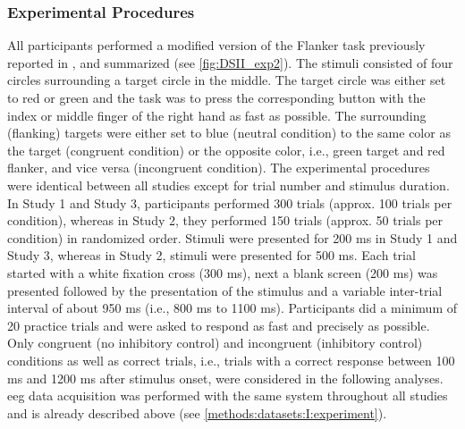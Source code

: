 \subsubsection{Experimental Procedures}
\label{methods:datasets:II:experiment}
All participants performed a modified version of the Flanker task previously reported in \cite{Reuter2017, Winneke2012, Winneke2019}, and summarized \cite{Reuter2019} (see \autoref{fig:DSII_exp2}). The stimuli consisted of four circles surrounding a target circle in the middle. The target circle was either set to red or green and the task was to press the corresponding button with the index or middle finger of the right hand as fast as possible. The surrounding (flanking) targets were either set to blue (neutral condition) to the same color as the target (congruent condition) or the opposite color, i.e., green target and red flanker, and vice versa (incongruent condition). The experimental procedures were identical between all studies except for trial number and stimulus duration. In Study 1 and Study 3, participants performed 300 trials (approx. 100 trials per condition), whereas in Study 2, they performed 150 trials (approx. 50 trials per condition) in randomized order. Stimuli were presented for 200 ms in Study 1 and Study 3, whereas in Study 2, stimuli were presented for 500 ms. Each trial started with a white fixation cross (300 ms), next a blank screen (200 ms) was presented followed by the presentation of the stimulus and a variable inter-trial interval of about 950 ms (i.e., 800 ms to 1100 ms). Participants did a minimum of 20 practice trials and were asked to respond as fast and precisely as possible. Only congruent (no inhibitory control) and incongruent (inhibitory control) conditions as well as correct trials, i.e., trials with a correct response between 100 ms and 1200 ms after stimulus onset, were considered in the following analyses.\\
\Gls{eeg} data acquisition was performed with the same system throughout all studies and is already described above (see \autoref{methods:datasets:I:experiment}). 

% 

